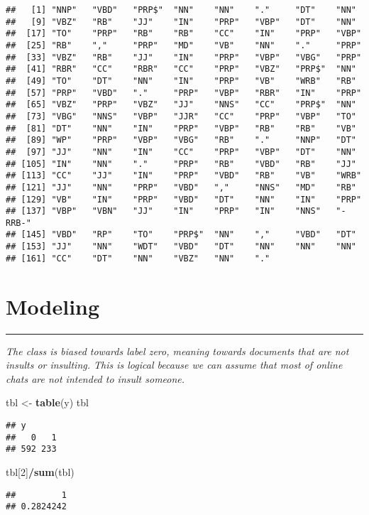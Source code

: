 \documentclass[]{article}
\newenvironment{Shaded}{\begin{snugshade}}{\end{snugshade}}
\newcommand{\DecValTok}[1]{\textcolor[rgb]{0.00,0.00,0.81}{#1}}
\newcommand{\KeywordTok}[1]{\textcolor[rgb]{0.13,0.29,0.53}{\textbf{#1}}}
\newcommand{\NormalTok}[1]{#1}
\newcommand{\OperatorTok}[1]{\textcolor[rgb]{0.81,0.36,0.00}{\textbf{#1}}}
\newcommand{\StringTok}[1]{\textcolor[rgb]{0.31,0.60,0.02}{#1}}
\begin{document}
\begin{verbatim}
##   [1] "NNP"   "VBD"   "PRP$"  "NN"    "NN"    "."     "DT"    "NN"   
##   [9] "VBZ"   "RB"    "JJ"    "IN"    "PRP"   "VBP"   "DT"    "NN"   
##  [17] "TO"    "PRP"   "RB"    "RB"    "CC"    "IN"    "PRP"   "VBP"  
##  [25] "RB"    ","     "PRP"   "MD"    "VB"    "NN"    "."     "PRP"  
##  [33] "VBZ"   "RB"    "JJ"    "IN"    "PRP"   "VBP"   "VBG"   "PRP"  
##  [41] "RBR"   "CC"    "RBR"   "CC"    "PRP"   "VBZ"   "PRP$"  "NN"   
##  [49] "TO"    "DT"    "NN"    "IN"    "PRP"   "VB"    "WRB"   "RB"   
##  [57] "PRP"   "VBD"   "."     "PRP"   "VBP"   "RBR"   "IN"    "PRP"  
##  [65] "VBZ"   "PRP"   "VBZ"   "JJ"    "NNS"   "CC"    "PRP$"  "NN"   
##  [73] "VBG"   "NNS"   "VBP"   "JJR"   "CC"    "PRP"   "VBP"   "TO"   
##  [81] "DT"    "NN"    "IN"    "PRP"   "VBP"   "RB"    "RB"    "VB"   
##  [89] "WP"    "PRP"   "VBP"   "VBG"   "RB"    "."     "NNP"   "DT"   
##  [97] "JJ"    "NN"    "IN"    "CC"    "PRP"   "VBP"   "DT"    "NN"   
## [105] "IN"    "NN"    "."     "PRP"   "RB"    "VBD"   "RB"    "JJ"   
## [113] "CC"    "JJ"    "IN"    "PRP"   "VBD"   "RB"    "VB"    "WRB"  
## [121] "JJ"    "NN"    "PRP"   "VBD"   ","     "NNS"   "MD"    "RB"   
## [129] "VB"    "IN"    "PRP"   "VBD"   "DT"    "NN"    "IN"    "PRP"  
## [137] "VBP"   "VBN"   "JJ"    "IN"    "PRP"   "IN"    "NNS"   "-RRB-"
## [145] "VBD"   "RP"    "TO"    "PRP$"  "NN"    ","     "VBD"   "DT"   
## [153] "JJ"    "NN"    "WDT"   "VBD"   "DT"    "NN"    "NN"    "NN"   
## [161] "CC"    "DT"    "NN"    "VBZ"   "NN"    "."
\end{verbatim}

\hypertarget{modeling}{%
\section{Modeling}\label{modeling}}

\begin{center}\rule{0.5\linewidth}{\linethickness}\end{center}

\emph{The class is biased towards label zero, meaning towards documents
that are not insults or insulting. This is logical because we can assume
that most of online chats are not intended to insult someone.}

\begin{Shaded}
\begin{Highlighting}[]
\NormalTok{tbl <-}\StringTok{ }\KeywordTok{table}\NormalTok{(y)}
\NormalTok{tbl}
\end{Highlighting}
\end{Shaded}

\begin{verbatim}
## y
##   0   1 
## 592 233
\end{verbatim}

\begin{Shaded}
\begin{Highlighting}[]
\NormalTok{tbl[}\DecValTok{2}\NormalTok{]}\OperatorTok{/}\KeywordTok{sum}\NormalTok{(tbl)}
\end{Highlighting}
\end{Shaded}

\begin{verbatim}
##         1 
## 0.2824242
\end{verbatim}
\end{document}
